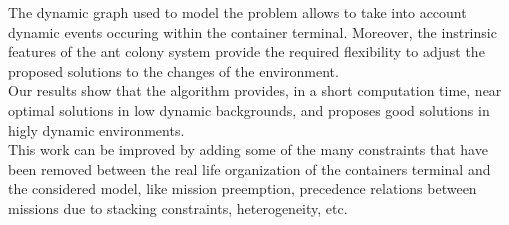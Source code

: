 \documentclass[a4paper,12pt]{article}
\begin{document}
The dynamic graph used to model the problem allows to take into account dynamic events occuring within the container terminal. Moreover, the instrinsic features of the ant colony system provide the required flexibility to adjust the proposed solutions to the changes of the environment.\\

Our results show that the algorithm provides, in a short computation time, near optimal solutions in low dynamic backgrounds, and proposes good solutions in higly dynamic environments.\\

This work can be improved by adding some of the many constraints that have been removed between the real life organization of the containers terminal and the considered model, like mission preemption, precedence relations between missions due to stacking constraints, heterogeneity, etc.  





\end{document}
